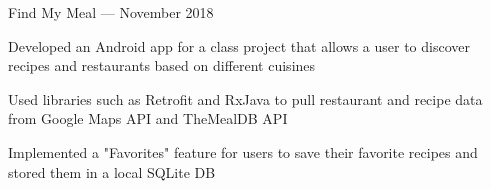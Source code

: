 \begin{cventries}

\cventryalt
{Find My Meal --- } %
{November 2018} %
{ %
\begin{cvitems}
\item {Developed an Android app for a class project that allows a user to discover recipes and restaurants based on different cuisines}
\item {Used libraries such as Retrofit and RxJava to pull restaurant and recipe data from Google Maps API and TheMealDB API}
\item {Implemented a "Favorites" feature for users to save their favorite recipes and stored them in a local SQLite DB}
\end{cvitems}
}




\end{cventries}
